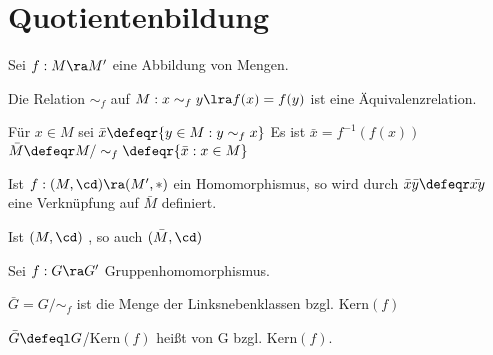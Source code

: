 \section{Quotientenbildung}

\begin{DefBem}
    Sei $f: M \ra M'$ eine Abbildung von Mengen.
    
    \begin{enum}
        \item Die Relation $\sim_f$ auf $M: x \sim_f y \lra f(x) = f(y)$ ist
        eine Äquivalenzrelation.

        \item Für $x \in M$ sei $\bar x \defeqr \{ y \in M : y\sim_f x\}$ Es ist
        $\bar x = f^{-1}(f(x))$ $\bar M \defeqr M/\sim_f \defeqr \{ \bar x : x \in M\}$

        \item Ist $f:(M,\cd) \ra (M', \ast)$ ein Homomorphismus, so wird durch
        $\bar x \bar y \defeqr \bar{xy}$ eine Verknüpfung auf $\bar M$ 
        definiert.\newline

        \item Ist $(M,\cd)$ \bla, so auch $(\bar M, \cd)$
    \end{enum}
\end{DefBem}

\begin{DefBem}
\label{1.14}
    Sei $f:G \ra G'$ Gruppenhomomorphismus.
    
    \begin{enum}
        \item $\bar G = G/\sim_f$ ist
        die Menge der Linksnebenklassen bzgl. Kern$(f)$

        \item  $\bar G \defeql G$/Kern$(f)$ heißt  von G bzgl.
        Kern$(f)$. \newline
    \end{enum}
\end{DefBem}

